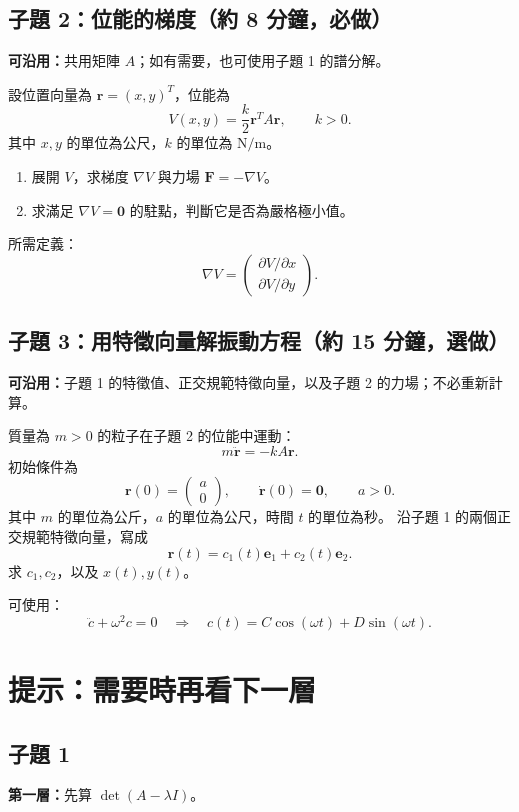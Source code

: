 \documentclass[12pt,a4paper]{article}
\begin{document}
\clearpage
\subsection*{子題 2：位能的梯度（約 8 分鐘，必做）}
\textbf{可沿用：}共用矩陣 \(A\)；如有需要，也可使用子題 1 的譜分解。

設位置向量為 \(\mathbf r=(x,y)^T\)，位能為
\[
    V(x,y)=\frac{k}{2}\mathbf r^TA\mathbf r,\qquad k>0.
\]
其中 \(x,y\) 的單位為公尺，\(k\) 的單位為 \(\mathrm{N/m}\)。
\begin{enumerate}
    \item 展開 \(V\)，求梯度 \(\nabla V\) 與力場 \(\mathbf F=-\nabla V\)。
    \item 求滿足 \(\nabla V=\mathbf0\) 的駐點，判斷它是否為嚴格極小值。
\end{enumerate}
所需定義：
\[
    \nabla V=
    \begin{pmatrix}
        \partial V/\partial x \\
        \partial V/\partial y
    \end{pmatrix}.
\]

\clearpage
\subsection*{子題 3：用特徵向量解振動方程（約 15 分鐘，選做）}
\textbf{可沿用：}子題 1 的特徵值、正交規範特徵向量，以及子題 2 的力場；不必重新計算。

質量為 \(m>0\) 的粒子在子題 2 的位能中運動：
\[
    m\ddot{\mathbf r}=-kA\mathbf r.
\]
初始條件為
\[
    \mathbf r(0)=\begin{pmatrix}a\\0\end{pmatrix},
    \qquad \dot{\mathbf r}(0)=\mathbf0,\qquad a>0.
\]
其中 \(m\) 的單位為公斤，\(a\) 的單位為公尺，時間 \(t\) 的單位為秒。
沿子題 1 的兩個正交規範特徵向量，寫成
\[
    \mathbf r(t)=c_1(t)\mathbf e_1+c_2(t)\mathbf e_2.
\]
求 \(c_1,c_2\)，以及 \(x(t),y(t)\)。

可使用：
\[
    \ddot c+\omega^2c=0
    \quad\Longrightarrow\quad
    c(t)=C\cos(\omega t)+D\sin(\omega t).
\]

\clearpage
\section{提示：需要時再看下一層}
\subsection*{子題 1}
\textbf{第一層：}先算 \(\det(A-\lambda I)\)。
\end{document}
